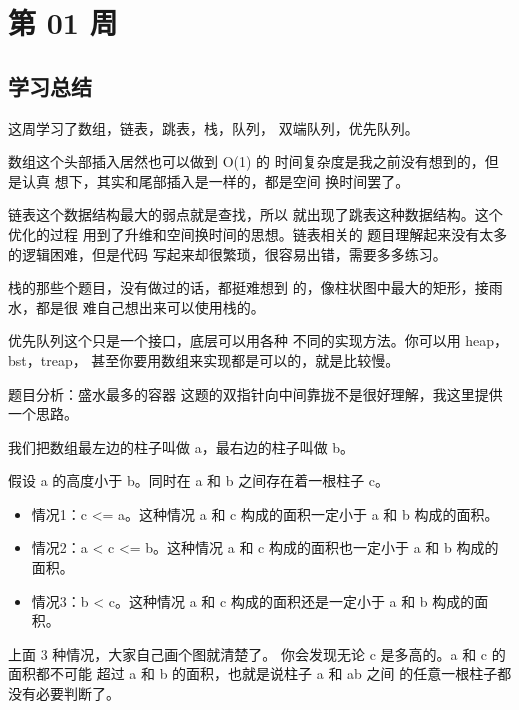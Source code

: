 \newpage
\section{第 01 周}




\subsection{学习总结}

这周学习了数组，链表，跳表，栈，队列，
双端队列，优先队列。

数组这个头部插入居然也可以做到 O(1) 的
时间复杂度是我之前没有想到的，但是认真
想下，其实和尾部插入是一样的，都是空间
换时间罢了。

链表这个数据结构最大的弱点就是查找，所以
就出现了跳表这种数据结构。这个优化的过程
用到了升维和空间换时间的思想。链表相关的
题目理解起来没有太多的逻辑困难，但是代码
写起来却很繁琐，很容易出错，需要多多练习。

栈的那些个题目，没有做过的话，都挺难想到
的，像柱状图中最大的矩形，接雨水，都是很
难自己想出来可以使用栈的。

优先队列这个只是一个接口，底层可以用各种
不同的实现方法。你可以用 heap，bst，treap，
甚至你要用数组来实现都是可以的，就是比较慢。

题目分析：盛水最多的容器
这题的双指针向中间靠拢不是很好理解，我这里提供一个思路。

我们把数组最左边的柱子叫做 a，最右边的柱子叫做 b。

假设 a 的高度小于 b。同时在 a 和 b 之间存在着一根柱子 c。

\begin{itemize}
  \item 情况1：c <= a。这种情况 a 和 c 构成的面积一定小于 a 和 b 构成的面积。
  \item 情况2：a < c <= b。这种情况 a 和 c 构成的面积也一定小于 a 和 b 构成的面积。
  \item 情况3：b < c。这种情况 a 和 c 构成的面积还是一定小于 a 和 b 构成的面积。
\end{itemize}

上面 3 种情况，大家自己画个图就清楚了。
你会发现无论 c 是多高的。a 和 c 的面积都不可能
超过 a 和 b 的面积，也就是说柱子 a 和 ab 之间
的任意一根柱子都没有必要判断了。
